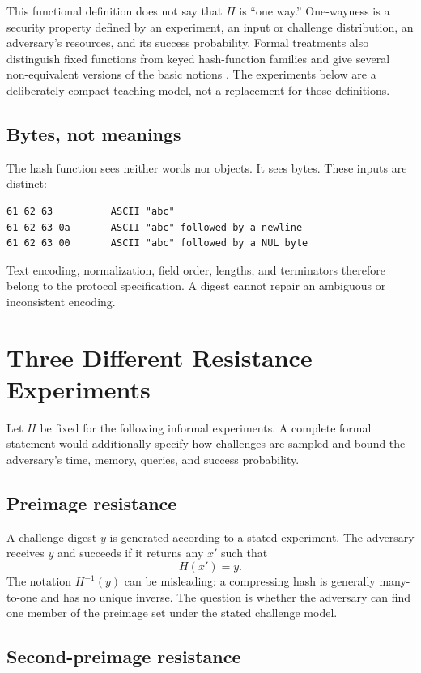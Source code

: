 This functional definition does not say that \(H\) is ``one way.'' One-wayness
is a security property defined by an experiment, an input or challenge
distribution, an adversary's resources, and its success probability. Formal
treatments also distinguish fixed functions from keyed hash-function families
and give several non-equivalent versions of the basic notions
\cite{rogaway2004hashbasics}. The experiments below are a deliberately compact
teaching model, not a replacement for those definitions.

\subsection{Bytes, not meanings}

The hash function sees neither words nor objects. It sees bytes. These inputs
are distinct:

\begin{verbatim}
61 62 63          ASCII "abc"
61 62 63 0a       ASCII "abc" followed by a newline
61 62 63 00       ASCII "abc" followed by a NUL byte
\end{verbatim}

Text encoding, normalization, field order, lengths, and terminators therefore
belong to the protocol specification. A digest cannot repair an ambiguous or
inconsistent encoding.

\section{Three Different Resistance Experiments}

Let \(H\) be fixed for the following informal experiments. A complete formal
statement would additionally specify how challenges are sampled and bound the
adversary's time, memory, queries, and success probability.

\subsection{Preimage resistance}

A challenge digest \(y\) is generated according to a stated experiment. The
adversary receives \(y\) and succeeds if it returns any \(x'\) such that
\[
    H(x') = y.
\]
The notation \(H^{-1}(y)\) can be misleading: a compressing hash is generally
many-to-one and has no unique inverse. The question is whether the adversary
can find one member of the preimage set under the stated challenge model.

\subsection{Second-preimage resistance}

